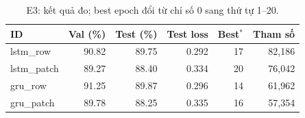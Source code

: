 \begin{table}[htbp]
\centering\small
\caption{E3: kết quả đo; best epoch đổi từ chỉ số 0 sang thứ tự 1--20.}\label{tab:resultsE3}
\begin{lrbox}{\reporttable}\begin{tabular}{lrrrrr}
\toprule
ID & Val (\%) & Test (\%) & Test loss & Best$^*$ & Tham số \\
\midrule
lstm\_row & 90.82 & 89.75 & 0.292 & 17 & 82,186 \\
lstm\_patch & 89.27 & 88.40 & 0.334 & 20 & 76,042 \\
gru\_row & 91.25 & 89.87 & 0.296 & 14 & 61,962 \\
gru\_patch & 89.78 & 88.25 & 0.335 & 16 & 57,354 \\
\bottomrule
\end{tabular}\end{lrbox}
\ifdim\wd\reporttable>\linewidth\resizebox{\linewidth}{!}{\usebox{\reporttable}}\else\usebox{\reporttable}\fi
\end{table}
